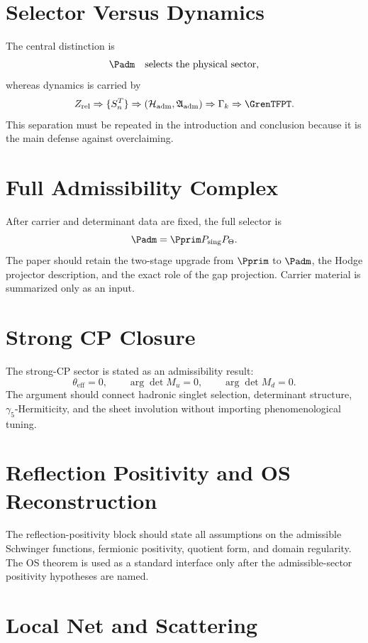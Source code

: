 \section{Selector Versus Dynamics}

The central distinction is
\[
\Padm\quad\text{selects the physical sector},
\]
whereas dynamics is carried by
\[
Z_{\mathrm{rel}}
\Rightarrow
\{S_n^T\}
\Rightarrow
(\mathcal H_{\mathrm{adm}},\mathfrak A_{\mathrm{adm}})
\Rightarrow
\Gamma_k
\Rightarrow
\GrenTFPT .
\]
This separation must be repeated in the introduction and conclusion because it is the main defense
against overclaiming.

\section{Full Admissibility Complex}

After carrier and determinant data are fixed, the full selector is
\[
\Padm=\Pprim P_{\mathrm{sing}}P_\Theta.
\]
The paper should retain the two-stage upgrade from $\Pprim$ to $\Padm$, the Hodge projector
description, and the exact role of the gap projection. Carrier material is summarized only as an
input.

\section{Strong CP Closure}

The strong-CP sector is stated as an admissibility result:
\[
\theta_{\mathrm{eff}}=0,
\qquad
\operatorname{arg}\det M_u=0,
\qquad
\operatorname{arg}\det M_d=0.
\]
The argument should connect hadronic singlet selection, determinant structure,
$\gamma_5$-Hermiticity, and the sheet involution without importing phenomenological tuning.

\section{Reflection Positivity and OS Reconstruction}

The reflection-positivity block should state all assumptions on the admissible Schwinger functions,
fermionic positivity, quotient form, and domain regularity. The OS theorem is used as a standard
interface only after the admissible-sector positivity hypotheses are named.

\section{Local Net and Scattering}

